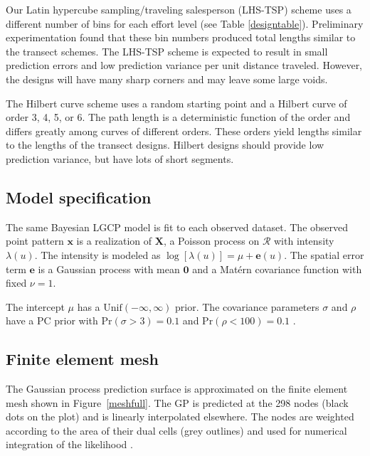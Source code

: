 \documentclass[review]{elsarticle}
\begin{document}
Our Latin hypercube sampling/traveling salesperson (LHS-TSP) scheme uses a
different number of bins for each effort level (see Table \ref{designtable}).
Preliminary experimentation found that these bin numbers produced total lengths
similar to the transect schemes. The LHS-TSP scheme is expected to result
in small prediction errors and low prediction variance per unit distance
traveled. However, the designs will have many sharp corners and may leave some
large voids.

The Hilbert curve scheme uses a random starting point and a Hilbert curve of
order 3, 4, 5, or 6. The path length is a deterministic function of the order
and differs greatly among curves of different orders. These orders yield
lengths similar to the lengths of the transect designs. Hilbert designs should
provide low prediction variance, but have lots of short segments.


\subsection{Model specification}
\label{simmodel}

The same Bayesian LGCP model is fit to each observed dataset. The observed
point pattern \(\mathbf{x}\) is a realization of \(\mathbf{X}\), a Poisson
process on \(\mathcal{R}\) with intensity \(\lambda(u)\). The intensity is
modeled as \(\log[\lambda(u)] = \mu + \mathbf{e}(u)\). The spatial error term
\(\mathbf{e}\) is a Gaussian process with mean \(\mathbf{0}\) and a
Mat\'{e}rn covariance function with fixed \(\nu = 1\).

The intercept \(\mu\) has a \(\mathrm{Unif}(-\infty, \infty)\) prior.
The covariance parameters \(\sigma\) and \(\rho\) have a PC prior with
\(\mathrm{Pr}(\sigma > 3) = 0.1\) and \(\mathrm{Pr}(\rho < 100) = 0.1\)
\citep{fuglstadetal,simpsonpc}.


\subsection{Finite element mesh}
\label{simmesh}

The Gaussian process prediction surface is approximated on the finite element
mesh shown in Figure~\ref{meshfull}. The GP is predicted at the 298 nodes
(black dots on the plot) and is linearly interpolated elsewhere. The nodes are
weighted according to the area of their dual cells (grey outlines) and used
for numerical integration of the likelihood \citep{lindgrenetal}.
\end{document}
